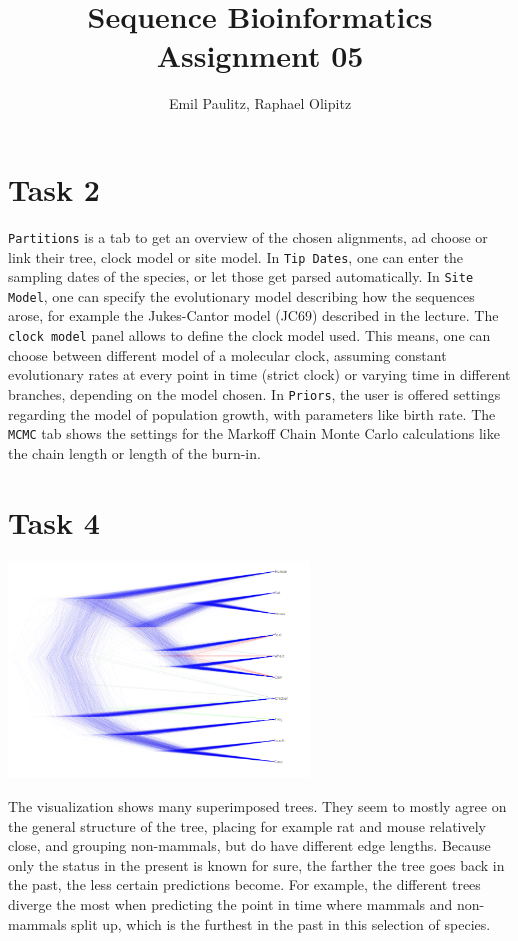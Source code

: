 \documentclass[10pt,a4paper]{article}
\author{Emil Paulitz, Raphael Olipitz}
\title{Sequence Bioinformatics\\Assignment 05}
\begin{document}
	\ohead{\theauthor}
	\cfoot{\pagemark}
	\maketitle
	\section*{Task 2}
		\texttt{Partitions} is a tab to get an overview of the chosen alignments, ad choose or link their tree, clock model or site model. In \texttt{Tip Dates}, one can enter the sampling dates of the species, or let those get parsed automatically. In \texttt{Site Model}, one can specify the evolutionary model describing how the sequences arose, for example the Jukes-Cantor model (JC69) described in the lecture. The \texttt{clock model} panel allows to define the clock model used. This means, one can choose between different model of a molecular clock, assuming constant evolutionary rates at every point in time (strict clock) or varying time in different branches, depending on the model chosen. In \texttt{Priors}, the user is offered settings regarding the model of population growth, with parameters like birth rate. The \texttt{MCMC} tab shows the settings for the Markoff Chain Monte Carlo calculations like the chain length or length of the burn-in.
	\section*{Task 4}
		\begin{center}\includegraphics[width = 0.6\textwidth]{densi.png}\end{center}
		The visualization shows many superimposed trees. They seem to mostly agree on the general structure of the tree, placing for example rat and mouse relatively close, and grouping non-mammals, but do have different edge lengths. Because only the status in the present is known for sure, the farther the tree goes back in the past, the less certain predictions become. For example, the different trees diverge the most when predicting the point in time where mammals and non-mammals split up, which is the furthest in the past in this selection of species.
\end{document}
